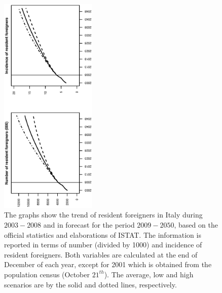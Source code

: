 \documentclass[10pt] {article}
\theoremstyle{definition}
\theoremstyle{plain}
\begin{document}
\begin{figure}[htbp]
	\centering
		\includegraphics[width=0.41\textwidth, angle=270]{Figure1.eps}
	\caption{The graphs show the trend of resident foreigners in Italy during $2003-2008$ and in forecast for the period $2009-2050$, based on the official statistics and elaborations of ISTAT. The information is reported in terms of number (divided by 1000) and incidence of resident foreigners. Both variables are calculated at the end of December of each year, except for 2001 which is obtained from the population census (October $21^{th}$). The average, low and high scenarios are by the solid and dotted lines, respectively.}
	\label{fig1}
\end{figure}
\end{document}
